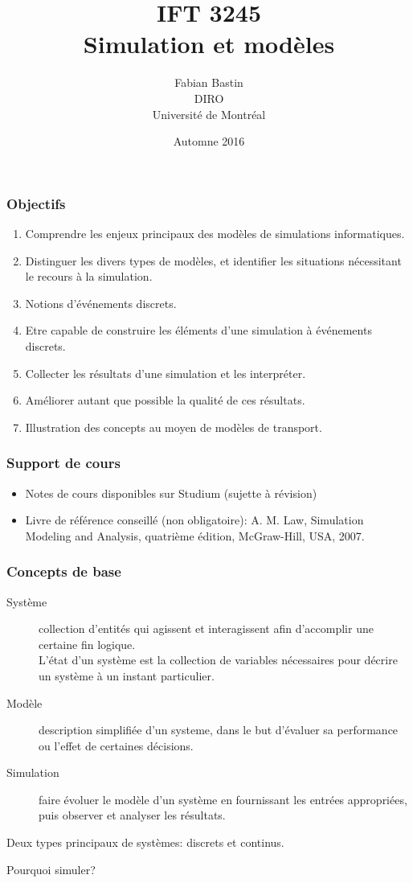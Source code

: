 \documentclass[t,usepdftitle=false]{beamer}
\title[IFT3245]{IFT 3245\\Simulation et modèles}
\author[Fabian Bastin]{Fabian Bastin\\DIRO\\Université de Montréal}
\date{Automne 2016}
\begin{document}
\frame{\titlepage}

\begin{frame}
\frametitle{Objectifs}

\begin{enumerate}
\item
Comprendre les enjeux principaux des modèles de simulations informatiques.
\item
Distinguer les divers types de modèles, et identifier les situations nécessitant le recours à la simulation.
\item
Notions d'événements discrets.
\item
Etre capable de construire les éléments d'une simulation à événements discrets.
\item
Collecter les résultats d'une simulation et les interpréter.
\item
Améliorer autant que possible la qualité de ces résultats.
\item
Illustration des concepts au moyen de modèles de transport.
\end{enumerate}

\end{frame}

\begin{frame}
\frametitle{Support de cours}

\begin{itemize}
\item
Notes de cours disponibles sur Studium (sujette à révision)
\item
Livre de référence conseillé (non obligatoire): 
A. M. Law, Simulation Modeling and Analysis, quatrième édition, McGraw-Hill, USA, 2007.
\end{itemize}

\end{frame}

\begin{frame}
\frametitle{Concepts de base}

\begin{description}
\item[Système]
collection d'entités qui agissent et interagissent afin d'accomplir une certaine fin logique.\\
L'état d'un système est la collection de variables nécessaires pour décrire un système à un instant particulier.
\item[Modèle]
description simplifiée d'un systeme, dans le but d'évaluer sa performance ou l'effet de certaines décisions.
\item[Simulation]
faire évoluer le modèle d'un système en fournissant les entrées appropriées, puis observer et analyser les résultats.
\end{description}

\mbox{}

Deux types principaux de systèmes: discrets et continus.

\mbox{}

Pourquoi simuler?

\end{frame}
\end{document}
